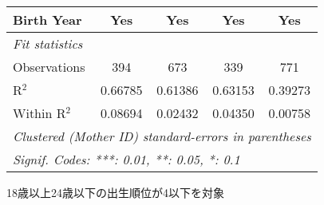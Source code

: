 \documentclass{article}
\begin{document}
\begin{threeparttable}[b]
\begin{tabular}{lcccc}
      Birth Year                                    & Yes            & Yes           & Yes          & Yes\\  
      \midrule
      \emph{Fit statistics}\\
      Observations                                  & 394            & 673           & 339          & 771\\  
      R$^2$                                         & 0.66785        & 0.61386       & 0.63153      & 0.39273\\  
      Within R$^2$                                  & 0.08694        & 0.02432       & 0.04350      & 0.00758\\  
      \midrule \midrule
      \multicolumn{5}{l}{\emph{Clustered (Mother ID) standard-errors in parentheses}}\\
      \multicolumn{5}{l}{\emph{Signif. Codes: ***: 0.01, **: 0.05, *: 0.1}}\\
   \end{tabular}
   
   \begin{tablenotes}\item 18歳以上24歳以下の出生順位が4以下を対象
   \end{tablenotes}
\end{threeparttable}
\par\endgroup
\end{document}
